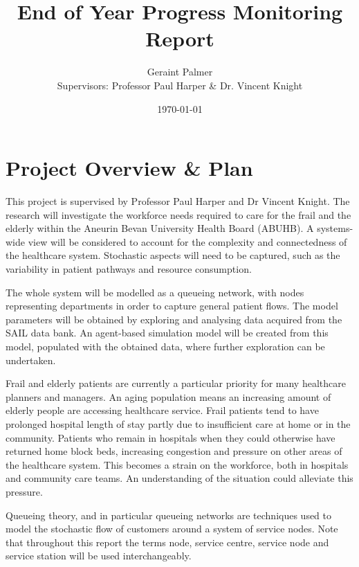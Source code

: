\documentclass{article}
\title{End of Year Progress Monitoring Report}
\author{Geraint Palmer\\{\small Supervisors: Professor Paul Harper \& Dr. Vincent Knight}}
\date{\today}
\begin{document}
\onehalfspacing

\maketitle




\section{Project Overview \& Plan}

This project is supervised by Professor Paul Harper and Dr Vincent Knight. %
The research will investigate the workforce needs required to care for the frail and the elderly within the Aneurin Bevan University Health Board (ABUHB).
A systems-wide view will be considered to account for the complexity and connectedness of the healthcare system.
Stochastic aspects will need to be captured, such as the variability in patient pathways and resource consumption.

The whole system will be modelled as a queueing network, with nodes representing departments in order to capture general patient flows.
The model parameters will be obtained by exploring and analysing data acquired from the SAIL data bank.
An agent-based simulation model will be created from this model, populated with
the obtained data, where further exploration can be undertaken.

Frail and elderly patients are currently a particular priority for many healthcare planners and managers.
An aging population means an increasing amount of elderly people are accessing healthcare service.
Frail patients tend to have prolonged hospital length of stay partly due to insufficient care at home or in the community.
Patients who remain in hospitals when they could otherwise have returned home block beds, increasing congestion and pressure on other areas of the healthcare system.
This becomes a strain on the workforce, both in hospitals and community care teams.
An understanding of the situation could alleviate this pressure.



Queueing theory, and in particular queueing networks are techniques used to model the stochastic flow of customers around a system of service nodes.
Note that throughout this report the terms node, service centre, service node and service station will be used interchangeably.
\end{document}
